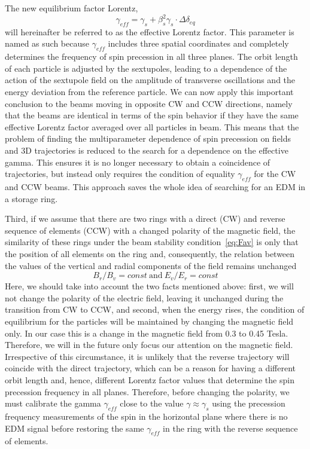 \documentclass[a4paper]{jacow}
\begin{document}
The new equilibrium factor Lorentz,
\begin{equation}\label{eq:effec gamma}
\gamma_{eff}=\gamma_{s}+\beta_s^{2} \gamma_s\cdot\Delta\delta_{eq}	
\end{equation}
will hereinafter be referred to as the effective Lorentz factor. This parameter is named as such because $\gamma_{eff}$ includes three spatial coordinates and completely determines the frequency of spin precession in all three planes. The orbit length of each particle is adjusted by the sextupoles, leading to a dependence of the action of the sextupole field on the amplitude of transverse oscillations and the energy deviation from the reference particle. We can now apply this important conclusion to the beams moving in opposite CW and CCW directions, namely that the beams are identical in terms of the spin behavior if they have the same effective Lorentz factor averaged over all particles in beam. This means that the problem of finding the multiparameter dependence of spin precession on fields and 3D trajectories is reduced to the search for a dependence on the effective gamma. This ensures it is no longer necessary to obtain a coincidence of trajectories, but instead only requires the condition of equality $\gamma_{eff}$   for the CW and CCW beams. This approach saves the whole idea of searching for an EDM in a storage ring.


Third, if we assume that there are two rings with a direct (CW) and reverse sequence of elements (CCW) with a changed polarity of the magnetic field, the similarity of these rings under the beam stability condition~\eqref{eq:Fav} is only that the position of all elements on the ring and, consequently, the relation between the values of the vertical and radial components of the field remains unchanged
\begin{equation}\label{eq:element position}
B_r/B_v=const\ \text {and}\ E_v/E_r=const
\end{equation}
Here, we should take into account the two facts mentioned above: first, we will not change the polarity of the electric field, leaving it unchanged during the transition from CW to CCW, and second, when the energy rises, the condition of equilibrium for the particles will be maintained by changing the magnetic field only. In our case this is a change in the magnetic field from 0.3 to 0.45 Tesla. Therefore, we will in the future only focus our attention on the magnetic field. Irrespective of this circumstance, it is unlikely that the reverse trajectory will coincide with the direct trajectory, which can be a reason for having a different orbit length and, hence, different Lorentz factor values   that determine the spin precession frequency in all planes. Therefore, before changing the polarity, we must calibrate the gamma $\gamma_{eff}$   close to the value $\gamma\approx\gamma_s$   using the precession frequency measurements of the spin in the horizontal plane where there is no EDM signal before restoring the same $\gamma_{eff}$   in the ring with the reverse sequence of elements.
\end{document}
